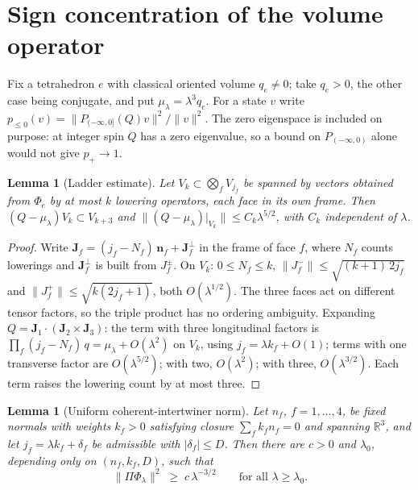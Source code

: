 \documentclass[11pt]{article}
\numberwithin{equation}{section}
\newtheorem{lemma}[theorem]{Lemma}
\theoremstyle{definition}
\theoremstyle{remark}
\begin{document}
\section{Sign concentration of the volume operator}\label{sec:s5}

Fix a tetrahedron $e$ with classical oriented volume $q_e\neq0$; take $q_e>0$,
the other case being conjugate, and put $\mu_\lambda=\lambda^3q_e$. For a state
$v$ write $p_{\le0}(v)=\|P_{(-\infty,0]}(Q)v\|^2/\|v\|^2$. The zero eigenspace is
included on purpose: at integer spin $Q$ has a zero eigenvalue, so a bound on
$P_{(-\infty,0)}$ alone would not give $p_+\to1$.

\begin{lemma}[Ladder estimate]\label{lem:ladder}
Let $V_k\subset\bigotimes_fV_{j_f}$ be spanned by vectors obtained from $\Phi_e$
by at most $k$ lowering operators, each face in its own frame. Then
$(Q-\mu_\lambda)V_k\subset V_{k+3}$ and
$\|(Q-\mu_\lambda)|_{V_k}\|\le C_k\lambda^{5/2}$, with $C_k$ independent of
$\lambda$.
\end{lemma}

\begin{proof}
Write $\mathbf J_f=(j_f-N_f)\,\mathbf n_f+\mathbf J_f^\perp$ in the frame of face
$f$, where $N_f$ counts lowerings and $\mathbf J_f^\perp$ is built from $J_f^\pm$.
On $V_k$: $0\le N_f\le k$, $\|J_f^-\|\le\sqrt{(k+1)\,2j_f}$ and
$\|J_f^+\|\le\sqrt{k(2j_f+1)}$, both $O(\lambda^{1/2})$. The three faces act on
different tensor factors, so the triple product has no ordering ambiguity.
Expanding $Q=\mathbf J_1\cdot(\mathbf J_2\times\mathbf J_3)$: the term with three
longitudinal factors is $\prod_f(j_f-N_f)\,q=\mu_\lambda+O(\lambda^2)$ on $V_k$,
using $j_f=\lambda k_f+O(1)$; terms with one transverse factor are
$O(\lambda^{5/2})$; with two, $O(\lambda^2)$; with three, $O(\lambda^{3/2})$. Each
term raises the lowering count by at most three.
\end{proof}

\begin{lemma}[Uniform coherent-intertwiner norm]\label{lem:unif}
Let $n_f$, $f=1,\dots,4$, be fixed normals with weights $k_f>0$ satisfying
closure $\sum_fk_fn_f=0$ and spanning $\mathbb R^3$, and let
$j_f=\lambda k_f+\delta_f$ be admissible with $|\delta_f|\le D$. Then there are
$c>0$ and $\lambda_0$, depending only on $(n_f,k_f,D)$, such that
\[
\|\Pi\Phi_\lambda\|^2\;\ge\;c\,\lambda^{-3/2}
\qquad\text{for all }\lambda\ge\lambda_0 .
\]
\end{lemma}
\end{document}
